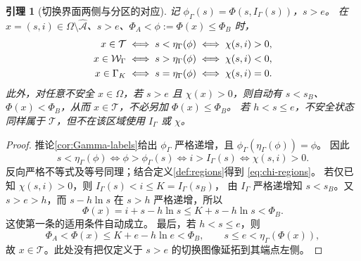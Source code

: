 \documentclass[11pt,a4paper,UTF8]{ctexart}
\newtheorem{lemma}[theorem]{引理}
\theoremstyle{definition}
\newcommand{\Acal}{\mathcal A}
\begin{document}
\begin{lemma}[切换界面两侧与分区的对应]
\label{lem:chi-regions}
记 $\phi_\Gamma(s)=\Phi(s,I_\Gamma(s))$，$s>e$。
在 $x=(s,i)\in\Omega\setminus\widehat{\Acal}$、$s>e$、$\Phi_A<\phi:=\Phi(x)\le\Phi_B$ 时，
\begin{align}
x\in\mathcal T&\iff s<\eta_\Gamma(\phi)\iff\chi(s,i)>0,\notag\\
x\in\mathcal W_\Gamma&\iff s>\eta_\Gamma(\phi)\iff\chi(s,i)<0,\notag\\
x\in\Gamma_K&\iff s=\eta_\Gamma(\phi)\iff\chi(s,i)=0.
\label{eq:chi-regions}
\end{align}
此外，对任意不安全 $x\in\Omega$，若 $s>e$ 且 $\chi(x)>0$，则自动有
$s<s_B$、$\Phi(x)<\Phi_B$，从而 $x\in\mathcal T$，不必另加 $\Phi(x)\le\Phi_B$。
若 $h<s\le e$，不安全状态同样属于 $\mathcal T$，但不在该区域使用 $I_\Gamma$ 或 $\chi$。
\end{lemma}
\begin{proof}
推论\ref{cor:Gamma-labels}给出 $\phi_\Gamma$ 严格递增，且
$\phi_\Gamma(\eta_\Gamma(\phi))=\phi$。
因此
\[
s<\eta_\Gamma(\phi)
\iff \phi>\phi_\Gamma(s)
\iff i>I_\Gamma(s)
\iff \chi(s,i)>0.
\]
反向严格不等式及等号同理；结合定义\ref{def:regions}得到 \eqref{eq:chi-regions}。
若仅已知 $\chi(s,i)>0$，则 $I_\Gamma(s)<i\le K=I_\Gamma(s_B)$，
由 $I_\Gamma$ 严格递增知 $s<s_B$。又 $s>e>h$，而 $s-h\ln s$ 在 $s>h$ 严格递增，所以
\[
\Phi(x)=i+s-h\ln s\le K+s-h\ln s<\Phi_B.
\]
这使第一条的适用条件自动成立。
最后，若 $h<s\le e$，则
\[
\Phi_A<\Phi(x)\le K+e-h\ln e<\Phi_B,
\qquad s\le e<\eta_\Gamma(\Phi(x)),
\]
故 $x\in\mathcal T$。此处没有把仅定义于 $s>e$ 的切换图像延拓到其端点左侧。
\end{proof}
\end{document}

